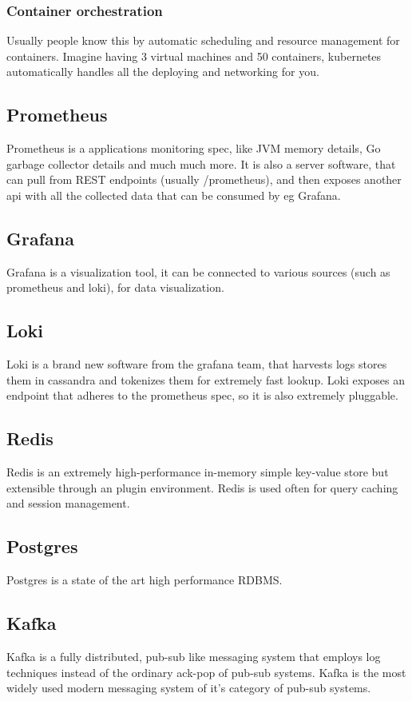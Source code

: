 \subsubsection{Container orchestration}
Usually people know this by automatic scheduling and resource management for containers.
Imagine having 3 virtual machines and 50 containers, kubernetes automatically handles all the deploying and networking for you.
\subsection{Prometheus}
Prometheus is a applications monitoring spec, like JVM memory details, Go garbage collector details and much much more.
It is also a server software, that can pull from REST endpoints (usually /prometheus), and then exposes another api with all the collected data that can be consumed by eg Grafana.\cite{prometheusDocs}
\subsection{Grafana}
Grafana is a visualization tool, it can be connected to various sources (such as prometheus and loki), for data visualization.\cite{grafanaAbout}
\subsection{Loki}
Loki is a brand new software from the grafana team, that harvests logs stores them in cassandra and tokenizes them for extremely fast lookup.
Loki exposes an endpoint that adheres to the prometheus spec, so it is also extremely pluggable.\cite{lokiAbout}
\subsection{Redis}
Redis is an extremely high-performance in-memory simple key-value store but extensible through an plugin environment.
Redis is used often for query caching and session management.\cite{redisAbout}
\subsection{Postgres}
Postgres is a state of the art high performance RDBMS.\cite{postgresAbout}
\subsection{Kafka}
Kafka is a fully distributed, pub-sub like messaging system that employs log techniques instead of the ordinary ack-pop of pub-sub systems.
Kafka is the most widely used modern messaging system of it's category of pub-sub systems.\cite{kafkaAbout}
